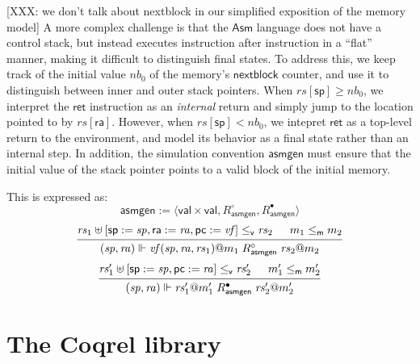 \documentclass[draft,11pt]{report}
\newcommand{\kw}[1]{\ensuremath{ \mathsf{#1} }}
\newcommand{\que}{\circ}         %
\newcommand{\ans}{\bullet}       %
\newcommand{\vref}{\le_\kw{v}}   %
\newcommand{\mext}{\le_\kw{m}}   %
\begin{document}
[XXX: we don't talk about nextblock in our simplified
exposition of the memory model]
A more complex challenge is that the $\kw{Asm}$ language
does not have a control stack,
but instead executes instruction after instruction
in a ``flat'' manner,
making it difficult to distinguish final states.
To address this,
we keep track of the initial value $\mathit{nb}_0$ of
the memory's $\kw{nextblock}$ counter,
and use it to distinguish between inner and outer
stack pointers.
When $\mathit{rs}[\kw{sp}] \ge \mathit{nb}_0$,
we interpret the \kw{ret} instruction as an \emph{internal} return
and simply jump to the location pointed to by $\mathit{rs}[\kw{ra}]$.
However, when $\mathit{rs}[\kw{sp}] < \mathit{nb}_0$,
we intepret \kw{ret} as a top-level return to the environment,
and model its behavior as a final state
rather than an internal step.
In addition,
the simulation convention $\kw{asmgen}$
must ensure that the initial value of the stack pointer
points to a valid block of the initial memory.

This is expressed as:
\[
  \kw{asmgen} := \langle \kw{val} \times \kw{val},
    R_\kw{asmgen}^\que, R_\kw{asmgen}^\ans \rangle
\]
\[
  \begin{prooftree}
  \hypo{\mathit{rs}_1 \uplus
    [\kw{sp} := \mathit{sp}, \kw{ra} := \mathit{ra}, \kw{pc} := \mathit{vf}]
    \vref \mathit{rs}_2}
  \hypo{m_1 \mext m_2}
  \infer2{
    (\mathit{sp}, \mathit{ra}) \Vdash
     \mathit{vf}(\mathit{sp}, \mathit{ra}, \mathit{rs}_1)@m_1
     \mathrel{R_\kw{asmgen}^\que}
     \mathit{rs}_2@m_2}
  \end{prooftree}
\]
\[
  \begin{prooftree}
  \hypo{
    \mathit{rs}_1' \uplus [\kw{sp} := \mathit{sp}, \kw{pc} := \mathit{ra}]
    \vref \mathit{rs}_2'}
  \hypo{m_1' \mext m_2'}
  \infer2{
    (\mathit{sp}, \mathit{ra}) \Vdash \mathit{rs}_1'@m_1'
    \mathrel{R_\kw{asmgen}^\ans}
    \mathit{rs}_2'@m_2'}
  \end{prooftree}
\]



\chapter{The Coqrel library} %




\end{document}
